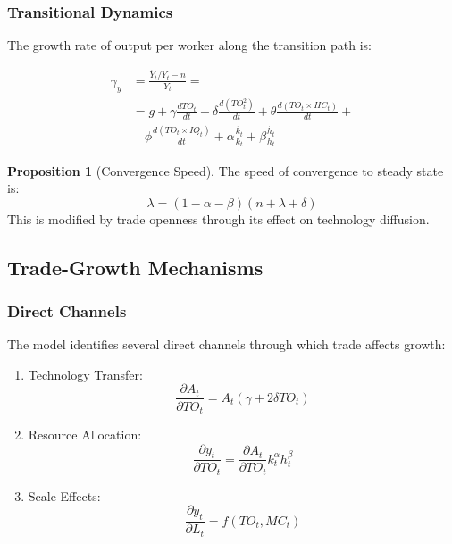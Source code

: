 \documentclass[12pt,a4paper]{article}
\theoremstyle{definition}
\newtheorem{proposition}{Proposition}
\begin{document}
\subsubsection{Transitional Dynamics}
The growth rate of output per worker along the transition path is:

\begin{equation}
\begin{split}
\gamma_y &= \frac{\dot{Y_t}/Y_t - n}{Y_t} = \\
&= g + \gamma \frac{dTO_t}{dt} + \delta \frac{d(TO_t^2)}{dt} + \theta \frac{d(TO_t \times HC_t)}{dt} + \\
&\quad \phi \frac{d(TO_t \times IQ_t)}{dt} + \alpha \frac{\dot{k_t}}{k_t} + \beta \frac{\dot{h_t}}{h_t}
\end{split}
\end{equation}

\begin{proposition}[Convergence Speed]
The speed of convergence to steady state is:
\begin{equation}
\lambda = (1-\alpha-\beta)(n + \lambda + \delta)
\end{equation}
This is modified by trade openness through its effect on technology diffusion.
\end{proposition}

\subsection{Trade-Growth Mechanisms}
\subsubsection{Direct Channels}
The model identifies several direct channels through which trade affects growth:

\begin{enumerate}
    \item Technology Transfer:
    \begin{equation}
    \frac{\partial A_t}{\partial TO_t} = A_t(\gamma + 2\delta TO_t)
    \end{equation}
    
    \item Resource Allocation:
    \begin{equation}
    \frac{\partial y_t}{\partial TO_t} = \frac{\partial A_t}{\partial TO_t}k_t^\alpha h_t^\beta
    \end{equation}
    
    \item Scale Effects:
    \begin{equation}
    \frac{\partial y_t}{\partial L_t} = f(TO_t, MC_t)
    \end{equation}
\end{enumerate}
\end{document}
